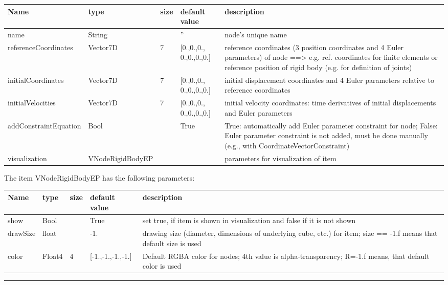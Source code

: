 \begin{center}
  \footnotesize
  \begin{longtable}{| p{4.5cm} | p{2.5cm} | p{0.5cm} | p{2.5cm} | p{6cm} |}
    \hline
    \bf Name & \bf type & \bf size & \bf default value & \bf description \\ \hline
    name &     String &      &     '' &     node's unique name\\ \hline
    referenceCoordinates &     Vector7D &     7 &     [0.,0.,0., 0.,0.,0.,0.] &     reference coordinates (3 position coordinates and 4 Euler parameters) of node ==> e.g. ref. coordinates for finite elements or reference position of rigid body (e.g. for definition of joints)\\ \hline
    initialCoordinates &     Vector7D &     7 &     [0.,0.,0., 0.,0.,0.,0.] &     initial displacement coordinates and 4 Euler parameters relative to reference coordinates\\ \hline
    initialVelocities &     Vector7D &     7 &     [0.,0.,0., 0.,0.,0.,0.] &     initial velocity coordinates: time derivatives of initial displacements and Euler parameters\\ \hline
    addConstraintEquation &     Bool &      &     True &     True: automatically add Euler parameter constraint for node; False: Euler parameter constraint is not added, must be done manually (e.g., with CoordinateVectorConstraint)\\ \hline
    visualization & VNodeRigidBodyEP & & & parameters for visualization of item \\ \hline
	  \end{longtable}
	\end{center}
The item VNodeRigidBodyEP has the following parameters:\vspace{-1cm}\\ 
\begin{center}
  \footnotesize
  \begin{longtable}{| p{4.5cm} | p{2.5cm} | p{0.5cm} | p{2.5cm} | p{6cm} |}
    \hline
    \bf Name & \bf type & \bf size & \bf default value & \bf description \\ \hline
    show &     Bool &      &     True &     set true, if item is shown in visualization and false if it is not shown\\ \hline
    drawSize &     float &      &     -1. &     drawing size (diameter, dimensions of underlying cube, etc.)  for item; size == -1.f means that default size is used\\ \hline
    color &     Float4 &     4 &     [-1.,-1.,-1.,-1.] &     Default RGBA color for nodes; 4th value is alpha-transparency; R=-1.f means, that default color is used\\ \hline
	  \end{longtable}
	\end{center}
\par\noindent\rule{\textwidth}{0.4pt}
\label{description_NodeRigidBodyEP}
